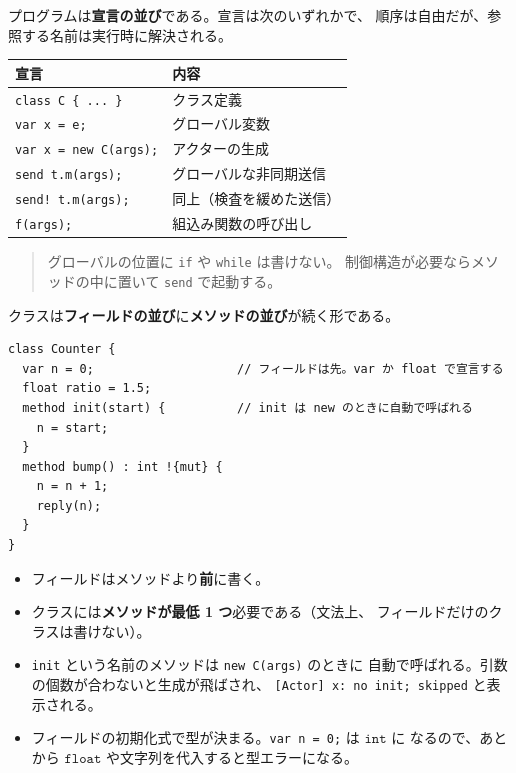 \documentclass[11pt,a4paper]{ltjsarticle}
\newcommand{\ty}[1]{\ensuremath{\mathtt{#1}}}
\begin{document}
プログラムは\textbf{宣言の並び}である。宣言は次のいずれかで、
順序は自由だが、参照する名前は実行時に解決される。

\begin{center}
\begin{tabular}{@{}ll@{}}
\toprule
宣言 & 内容 \\
\midrule
\texttt{class C \{ ... \}}            & クラス定義 \\
\texttt{var x = e;}                   & グローバル変数 \\
\texttt{var x = new C(args);}         & アクターの生成 \\
\texttt{send t.m(args);}              & グローバルな非同期送信 \\
\texttt{send! t.m(args);}             & 同上（検査を緩めた送信） \\
\texttt{f(args);}                     & 組込み関数の呼び出し \\
\bottomrule
\end{tabular}
\end{center}

\begin{quote}\small
グローバルの位置に \texttt{if} や \texttt{while} は書けない。
制御構造が必要ならメソッドの中に置いて \texttt{send} で起動する。
\end{quote}

クラスは\textbf{フィールドの並び}に\textbf{メソッドの並び}が続く形である。

\begin{lstlisting}
class Counter {
  var n = 0;                    // フィールドは先。var か float で宣言する
  float ratio = 1.5;
  method init(start) {          // init は new のときに自動で呼ばれる
    n = start;
  }
  method bump() : int !{mut} {
    n = n + 1;
    reply(n);
  }
}
\end{lstlisting}

\begin{itemize}
\item フィールドはメソッドより\textbf{前}に書く。
\item クラスには\textbf{メソッドが最低 1 つ}必要である（文法上、
  フィールドだけのクラスは書けない）。
\item \texttt{init} という名前のメソッドは \texttt{new C(args)} のときに
  自動で呼ばれる。引数の個数が合わないと生成が飛ばされ、
  \texttt{[Actor] x: no init; skipped} と表示される。
\item フィールドの初期化式で型が決まる。\texttt{var n = 0;} は \ty{int} に
  なるので、あとから \ty{float} や文字列を代入すると型エラーになる。
\end{itemize}
\end{document}
